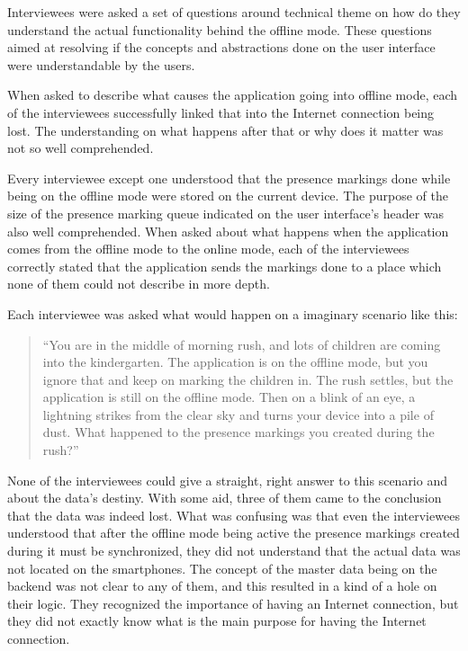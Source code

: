 Interviewees were asked a set of questions around technical theme on how do they understand the actual functionality behind the offline mode. These questions aimed at resolving if the concepts and abstractions done on the user interface were understandable by the users. 

When asked to describe what causes the application going into offline mode, each of the interviewees successfully linked that into the Internet connection being lost. The understanding on what happens after that or why does it matter was not so well comprehended. 

Every interviewee except one understood that the presence markings done while being on the offline mode were stored on the current device. The purpose of the size of the presence marking queue indicated on the user interface's header was also well comprehended. When asked about what happens when the application comes from the offline mode to the online mode, each of the interviewees correctly stated that the application sends the markings done to a place which none of them could not describe in more depth.

Each interviewee was asked what would happen on a imaginary scenario like this: 
\begin{quote}
``You are in the middle of morning rush, and lots of children are coming into the kindergarten. The application is on the offline mode, but you ignore that and keep on marking the children in. The rush settles, but the application is still on the offline mode. Then on a blink of an eye, a lightning strikes from the clear sky and turns your device into a pile of dust. What happened to the presence markings you created during the rush?'' 
\end{quote}

None of the interviewees could give a straight, right answer to this scenario and about the data's destiny. With some aid, three of them came to the conclusion that the data was indeed lost. What was confusing was that even the interviewees understood that after the offline mode being active the presence markings created during it must be synchronized, they did not understand that the actual data was not located on the smartphones. The concept of the master data being on the backend was not clear to any of them, and this resulted in a kind of a hole on their logic. They recognized the importance of having an Internet connection, but they did not exactly know what is the main purpose for having the Internet connection.







